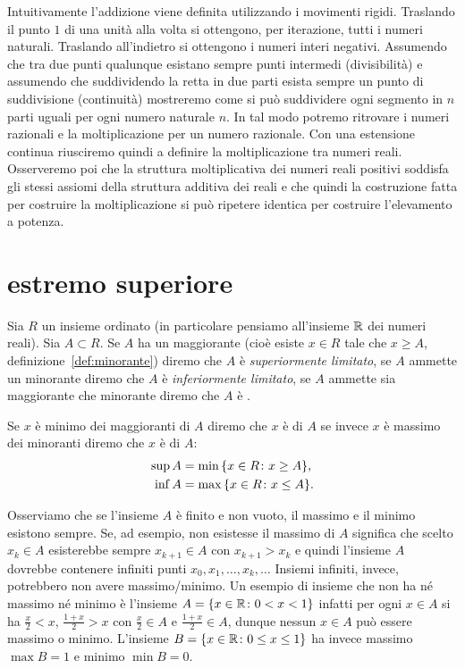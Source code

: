 Intuitivamente l'addizione viene definita utilizzando i movimenti rigidi.
Traslando il punto $1$ di una unità alla volta si ottengono, per iterazione, tutti i numeri naturali.
Traslando all'indietro si ottengono i numeri interi negativi. 
Assumendo che tra due punti qualunque esistano sempre punti intermedi (divisibilità) e
assumendo che suddividendo la retta in due parti esista sempre un punto di 
suddivisione (continuità) mostreremo come si può suddividere 
ogni segmento in $n$ parti uguali per ogni numero naturale $n$. 
In tal modo potremo ritrovare i numeri razionali e la moltiplicazione per un numero razionale.
Con una estensione continua riusciremo quindi a definire la moltiplicazione 
tra numeri reali. 
Osserveremo poi che la struttura moltiplicativa dei numeri reali positivi soddisfa 
gli stessi assiomi della struttura additiva dei reali e che quindi la costruzione fatta 
per costruire la moltiplicazione si può ripetere identica per costruire l'elevamento a potenza.

\section{estremo superiore}

\begin{definition}%
  Sia $R$ un insieme ordinato (in particolare pensiamo all'insieme ${\mathbb R}$ 
  dei numeri reali).
  \mymark{***}%
  Sia $A \subset R$.
  Se $A$ ha un maggiorante (cioè esiste $x\in R$ tale che $x\ge A$, definizione~\ref{def:minorante})
  diremo che $A$ è \emph{superiormente limitato},
  se $A$ ammette un minorante diremo che $A$ è \emph{inferiormente limitato},
  se $A$ ammette sia maggiorante che minorante diremo che $A$ è 
  .
  
  Se $x$ è minimo dei maggioranti di $A$ diremo che $x$ è
  di $A$ se invece $x$ è massimo dei minoranti diremo che $x$ è
   di $A$:
  \begin{align*}
  \sup A &= \min {\left\{ x\in R \colon x\ge A \right\}}, \\
  \inf A &= \max {\left\{ x\in R \colon x \le A \right\}}.
  \end{align*}
  \index{$\sup$}%
  \index{$\inf$}%
\end{definition}

Osserviamo che se l'insieme $A$ è finito e non vuoto,
il massimo e il minimo esistono
sempre.
Se, ad esempio, non esistesse il massimo di $A$ significa che scelto
$x_k\in A$ esisterebbe sempre $x_{k+1}\in A$ con $x_{k+1} > x_k$ e quindi l'insieme
$A$ dovrebbe contenere infiniti punti $x_0,x_1, \dots, x_k,\dots $
Insiemi infiniti, invece, potrebbero non avere massimo/minimo.
Un esempio di insieme che non ha né massimo né minimo è
l'insieme $A = {\left\{ x\in {\mathbb R}\colon 0<x<1 \right\}}$ infatti per ogni
$x\in A$ si ha $\frac x 2<x$, $\frac{1+x}{2}>x$
con $\frac x 2\in A$ e $\frac{1+x}{2}\in A$,
dunque nessun $x\in A$ può essere
massimo o minimo. L'insieme $B={\left\{ x\in {\mathbb R} \colon 0\le x \le 1 \right\}}$
ha invece massimo $\max B= 1$ e minimo $\min B=0$.


